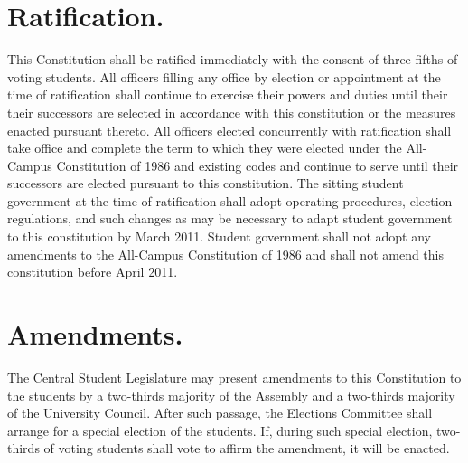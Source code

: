 \section{Ratification.}
    This Constitution shall be ratified immediately with the consent of three-fifths of voting students. All officers filling any office by election or appointment at the time of ratification shall continue to exercise their powers and duties until their their successors are selected in accordance with this constitution or the measures enacted pursuant thereto. All officers elected concurrently with ratification shall take office and complete the term to which they were elected under the All-Campus Constitution of 1986 and existing codes and continue to serve until their successors are elected pursuant to this constitution. The sitting student government at the time of ratification shall adopt operating procedures, election regulations, and such changes as may be necessary to adapt student government to this constitution by March 2011. Student government shall not adopt any amendments to the All-Campus Constitution of 1986 and shall not amend this constitution before April 2011.


\section{Amendments.}
    The Central Student Legislature may present amendments to this Constitution to the students by a two-thirds majority of the Assembly and a two-thirds majority of the University Council. After such passage, the Elections Committee shall arrange for a special election of the students. If, during such special election, two-thirds of voting students shall vote to affirm the amendment, it will be enacted.